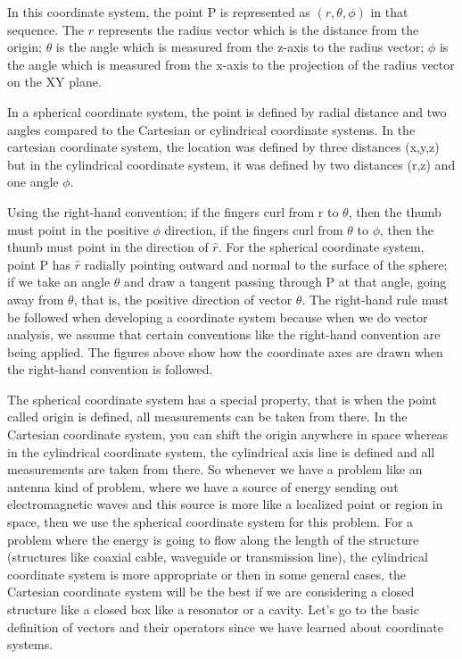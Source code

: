  In this coordinate system, the point P is represented as $(r,\theta, \phi)$ in that sequence. The $r$ represents the radius vector which is the distance from the origin; $\theta$ is the angle which is measured from the z-axis to the radius vector; $\phi$ is the angle which is measured from the x-axis to the projection of the radius vector on the XY plane.

In a spherical coordinate system, the point is defined by radial distance and two angles compared to the Cartesian or cylindrical coordinate systems. In the cartesian coordinate system, the location was defined by three distances (x,y,z) but in the cylindrical coordinate system, it was defined by two distances (r,z) and one angle $\phi$.

Using the right-hand convention; if the fingers curl from r to $\theta$, then the thumb must point in the positive $\phi$ direction, if the fingers curl from $\theta$ to $\phi$, then the thumb must point in the direction of $\hat{r}$. For the spherical coordinate system, point P has $\hat{r}$ radially pointing outward and normal to the surface of the sphere; if we take an angle $\theta$ and draw a tangent passing through P at that angle, going away from $\theta$, that is, the positive direction of vector $\theta$. The right-hand rule must be followed when developing a coordinate system because when we do vector analysis, we assume that certain conventions like the right-hand convention are being applied. The figures above show how the coordinate axes are drawn when the right-hand convention is followed.

The spherical coordinate system has a special property, that is when the point called origin is defined, all measurements can be taken from there. In the Cartesian coordinate system, you can shift the origin anywhere in space whereas in the cylindrical coordinate system, the cylindrical axis line is defined and all measurements are taken from there. So whenever we have a problem like an antenna kind of problem, where we have a source of energy sending out electromagnetic waves and this source is more like a localized point or region in space, then we use the spherical coordinate system for this problem. For a problem where the energy is going to flow along the length of the structure (structures like coaxial cable, waveguide or transmission line), the cylindrical coordinate system is more appropriate or then in some general cases, the Cartesian coordinate system will be the best if we are considering a closed structure like a closed box like a resonator or a cavity. Let's go to the basic definition of vectors and their operators since we have learned about coordinate systems. 

